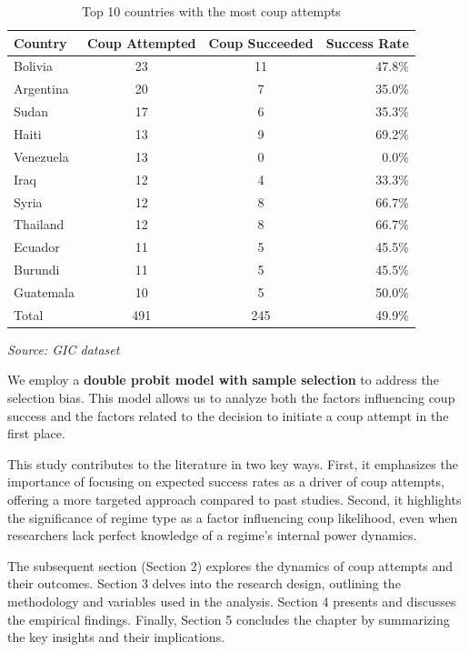 \documentclass[
  12pt,
]{report}
\begin{document}
\begingroup
\setlength{}
\setlength{}\fontsize{12.0pt}{14.4pt}\selectfont
\setlength{\LTpost}{0mm}

\begin{longtable}{@{\extracolsep{\fill}}lccr}

\caption{\label{tbl-coups}Top 10 countries with the most coup attempts}

\tabularnewline

\toprule
Country & Coup Attempted & Coup Succeeded & Success Rate \\ 
\midrule\addlinespace[2.5pt]
Bolivia & 23 & 11 & 47.8\% \\ 
Argentina & 20 & 7 & 35.0\% \\ 
Sudan & 17 & 6 & 35.3\% \\ 
Haiti & 13 & 9 & 69.2\% \\ 
Venezuela & 13 & 0 & 0.0\% \\ 
Iraq & 12 & 4 & 33.3\% \\ 
Syria & 12 & 8 & 66.7\% \\ 
Thailand & 12 & 8 & 66.7\% \\ 
Ecuador & 11 & 5 & 45.5\% \\ 
Burundi & 11 & 5 & 45.5\% \\ 
Guatemala & 10 & 5 & 50.0\% \\ 
Total & 491 & 245 & 49.9\% \\ 
\bottomrule

\end{longtable}

\begin{minipage}{\linewidth}
\emph{Source: GIC dataset}\\
\end{minipage}
\endgroup

We employ a \textbf{double probit model with sample selection} to
address the selection bias. This model allows us to analyze both the
factors influencing coup success and the factors related to the decision
to initiate a coup attempt in the first place.

This study contributes to the literature in two key ways. First, it
emphasizes the importance of focusing on expected success rates as a
driver of coup attempts, offering a more targeted approach compared to
past studies. Second, it highlights the significance of regime type as a
factor influencing coup likelihood, even when researchers lack perfect
knowledge of a regime's internal power dynamics.

The subsequent section (Section 2) explores the dynamics of coup
attempts and their outcomes. Section 3 delves into the research design,
outlining the methodology and variables used in the analysis. Section 4
presents and discusses the empirical findings. Finally, Section 5
concludes the chapter by summarizing the key insights and their
implications.
\end{document}
